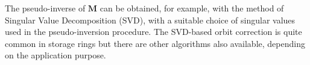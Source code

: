  The pseudo-inverse of $\mathbf{M}$ can be obtained, for example, with the method of Singular Value Decomposition (SVD), with a suitable choice of singular values used in the pseudo-inversion procedure. The SVD-based orbit correction is quite common in storage rings but there are other algorithms also available, depending on the application purpose.
